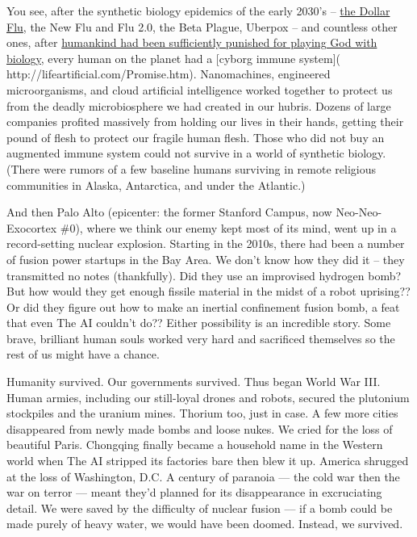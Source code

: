 \documentclass{report}  %
\begin{document}
You see, after the synthetic biology epidemics of the early 2030’s – \href{https://www.acsh.org/news/2017/11/22/black-friday-bioterrorism-if-tom-clancys-division-were-real-how-could-it-happen-10346}{the Dollar Flu}, the New Flu and Flu 2.0, the Beta Plague, Uberpox – and countless other ones, after \href{http://lifeartificial.com/}{humankind had been sufficiently punished for playing God with biology}, every human on the planet had a [cyborg immune system]( http://lifeartificial.com/Promise.htm). Nanomachines, engineered microorganisms, and cloud artificial intelligence worked together to protect us from the deadly microbiosphere we had created in our hubris. Dozens of large companies profited massively from holding our lives in their hands, getting their pound of flesh to protect our fragile human flesh. Those who did not buy an augmented immune system could not survive in a world of synthetic biology. (There were rumors of a few baseline humans surviving in remote religious communities in Alaska, Antarctica, and under the Atlantic.)

And then Palo Alto (epicenter: the former Stanford Campus, now Neo-Neo-Exocortex \#0), where we think our enemy kept most of its mind, went up in a record-setting nuclear explosion. Starting in the 2010s, there had been a number of fusion power startups in the Bay Area. We don’t know how they did it – they transmitted no notes (thankfully). Did they use an improvised hydrogen bomb? But how would they get enough fissile material in the midst of a robot uprising?? Or did they figure out how to make an inertial confinement fusion bomb, a feat that even The AI couldn’t do?? Either possibility is an incredible story. Some brave, brilliant human souls worked very hard and sacrificed themselves so the rest of us might have a chance.

Humanity survived. Our governments survived. Thus began World War III. Human armies, including our still-loyal drones and robots, secured the plutonium stockpiles and the uranium mines. Thorium too, just in case. A few more cities disappeared from newly made bombs and loose nukes. We cried for the loss of beautiful Paris. Chongqing finally became a household name in the Western world when The AI stripped its factories bare then blew it up. America shrugged at the loss of Washington, D.C. A century of paranoia --- the cold war then the war on terror --– meant they’d planned for its disappearance in excruciating detail.  We were saved by the difficulty of nuclear fusion --– if a bomb could be made purely of heavy water, we would have been doomed. Instead, we survived.
\end{document}
